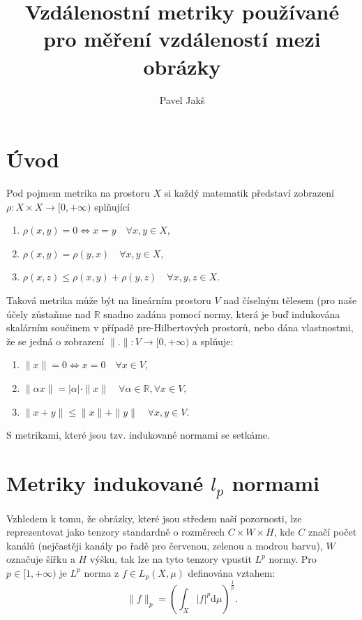 \documentclass[czech]{article}
\author{Pavel Jakš}
\title{Vzdálenostní metriky používané pro měření vzdáleností mezi obrázky}
\begin{document}
\maketitle

\section*{Úvod}

Pod pojmem metrika na prostoru $X$ si každý matematik představí zobrazení $\rho : X \times X \rightarrow [0, + \infty)$
splňující
\begin{enumerate}
    \item $\rho(x, y) = 0 \iff x = y \quad \forall x, y \in X$,
    \item $\rho(x, y) = \rho(y, x) \quad \forall x, y \in X$,
    \item $\rho(x, z) \leq \rho(x, y) + \rho(y, z) \quad \forall x, y, z \in X$.
\end{enumerate}

Taková metrika může být na lineárním prostoru $V$ nad číselným tělesem (pro naše účely zůstaňme nad $\mathbb{R}$
snadno zadána pomocí normy,
která je buď indukována skalárním součinem v případě pre-Hilbertových prostorů,
nebo dána vlastnostmi, že se jedná o zobrazení $\|.\| : V \rightarrow [0, + \infty)$
a splňuje:
\begin{enumerate}
    \item $\|x\| = 0 \iff x = 0 \quad \forall x \in V$,
    \item $\|\alpha x\| = |\alpha| \cdot \|x\| \quad \forall \alpha \in \mathbb{R}, \forall x \in V$,
    \item $\|x + y\| \leq \|x\| + \|y\| \quad \forall x, y \in V$.
\end{enumerate}
S metrikami, které jsou tzv. indukované normami se setkáme.


\section{Metriky indukované $l_p$ normami}

Vzhledem k tomu, že obrázky, které jsou středem naší pozornosti,
lze reprezentovat jako tenzory standardně o rozměrech $C \times W \times H$,
kde $C$ značí počet kanálů (nejčastěji kanály po řadě pro červenou, zelenou a modrou barvu),
$W$ označuje šířku a $H$ výšku, tak lze na tyto tenzory vpustit $L^p$ normy.
Pro $p \in [1, + \infty)$ je $L^p$ norma z $f \in L_p(X, \mu )$
definována vztahem:
\begin{equation*}
    \|f\|_p = \left(\int_X |f|^p \mathrm{d} \mu \right)^{\frac{1}{p}}.
\end{equation*}
\end{document}
